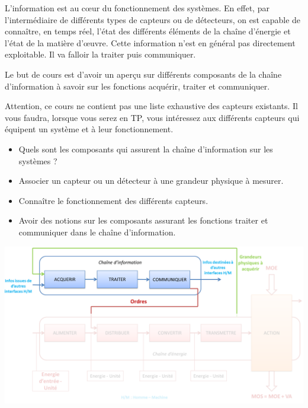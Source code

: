 \documentclass[10pt]{article}
\begin{document}
L'information est au c\oe{}ur du fonctionnement des systèmes. En effet, par l'intermédiaire de différents types de capteurs ou de détecteurs, on est capable de connaître, en temps réel, l'état des différents éléments de la chaîne d'énergie et l'état de la matière d'\oe{}uvre. Cette information n'est en général pas directement exploitable. Il va falloir la traiter puis communiquer.

Le but de cours est d'avoir un aperçu sur différents composants de la chaîne d'information à savoir sur les fonctions acquérir, traiter et communiquer.

Attention, ce cours ne contient pas une liste exhaustive des capteurs existants. Il vous faudra, lorsque vous serez en TP, vous intéressez aux différents capteurs qui équipent un système et à leur fonctionnement.


\begin{prob}
\begin{itemize}
\item Quels sont les composants qui assurent la chaîne d'information sur les systèmes ?
\end{itemize}
\end{prob}

\begin{savoir}
\begin{itemize}
\item Associer un capteur ou un détecteur à une grandeur physique à mesurer.
\item Connaître le fonctionnement des différents capteurs.
\item Avoir des notions sur les composants assurant les fonctions traiter et communiquer dans le chaîne d'information.
\end{itemize}
\end{savoir}

\begin{center}
    \includegraphics[width=.9\textwidth]{images/ch_info}
  \end{center}
\end{document}
